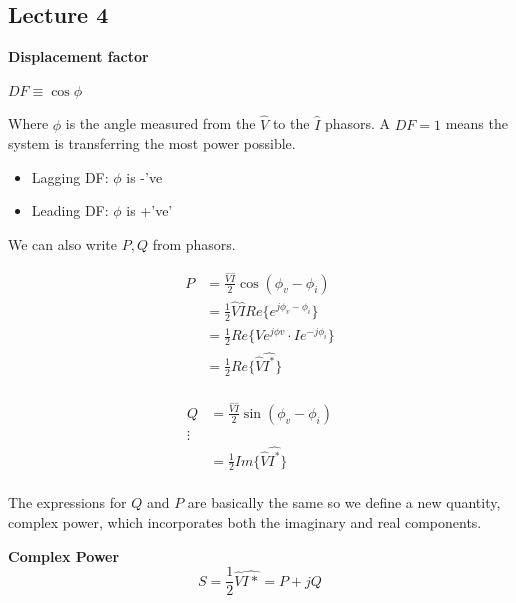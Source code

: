 \documentclass[10pt]{article}
\begin{document}
\subsection{Lecture 4}


\begin{definition}
	\textbf{Displacement factor} 

	$ DF \equiv \cos \phi $ 

	Where $ \phi $ is the angle measured from the $ \hat{V} $ to the $ \hat{I} $ phasors.
	A $ DF = 1 $ means the system is transferring the most power possible.

	\begin{itemize}
		\item Lagging DF: $ \phi  $ is -'ve
		\item Leading DF: $ \phi  $ is +'ve'
	\end{itemize}
\end{definition}


We can also write $ P, Q$ from phasors.

\begin{equation}
	\begin{split}
		P  &= \frac{\hat{V} \hat{I}}{2} \cos(\phi_v - \phi_i) \\
			 &= \frac{1}{2} \hat{V} \hat{I} Re\{e^{j\phi_v - \phi_i}\} \\
			 &= \frac{1}{2} Re\{Ve^{j\phi v} \cdot I e^{-j\phi_i}  \} \\
			 &= \frac{1}{2} Re\{\hat{V} \hat{I^*}\} \\
	\end{split}
\end{equation}

\begin{equation}
	\begin{split}
		Q  &= \frac{\hat{V} \hat{I}}{2} \sin(\phi_v - \phi_i) \\
		\vdots \\
			 &= \frac{1}{2} Im \{\hat{V} \hat{I^*}\} \\
	\end{split}
\end{equation}


The expressions for $ Q $  and $ P $ are basically the same so we define a new quantity, complex power, which incorporates both the imaginary and real components.


\begin{definition}
	\textbf{Complex Power} 
	\begin{equation}
		S = \frac{1}{2} \hat{V} \hat{I*} = P + jQ
		\label{eq:349:complex_power}
	\end{equation}
	
\end{definition}
\end{document}
